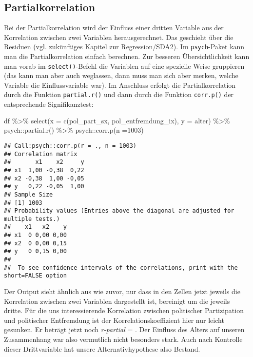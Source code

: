 \documentclass[
]{book}
\newenvironment{Shaded}{\begin{snugshade}}{\end{snugshade}}
\newcommand{\AttributeTok}[1]{\textcolor[rgb]{0.77,0.63,0.00}{#1}}
\newcommand{\DecValTok}[1]{\textcolor[rgb]{0.00,0.00,0.81}{#1}}
\newcommand{\FunctionTok}[1]{\textcolor[rgb]{0.00,0.00,0.00}{#1}}
\newcommand{\NormalTok}[1]{#1}
\newcommand{\SpecialCharTok}[1]{\textcolor[rgb]{0.00,0.00,0.00}{#1}}
\begin{document}
\hypertarget{partialkorrelation}{%
\subsection{Partialkorrelation}\label{partialkorrelation}}

Bei der Partialkorrelation wird der Einfluss einer dritten Variable aus der Korrelation zwischen zwei Variablen herausgerechnet. Das geschieht über die Residuen (vgl. zukünftiges Kapitel zur Regression/SDA2). Im \texttt{psych}-Paket kann man die Partialkorrelation einfach berechnen. Zur besseren Übersichtlichkeit kann man vorab im \texttt{select()}-Befehl die Variablen auf eine spezielle Weise gruppieren (das kann man aber auch weglassen, dann muss man sich aber merken, welche Variable die Einflussvariable war). Im Anschluss erfolgt die Partialkorrelation durch die Funktion \texttt{partial.r()} und dann durch die Funktion \texttt{corr.p()} der entsprechende Signifikanztest:

\begin{Shaded}
\begin{Highlighting}[]
\NormalTok{df }\SpecialCharTok{\%\textgreater{}\%} 
  \FunctionTok{select}\NormalTok{(}\AttributeTok{x =} \FunctionTok{c}\NormalTok{(pol\_part\_sx, pol\_entfremdung\_ix), }\AttributeTok{y =}\NormalTok{ alter) }\SpecialCharTok{\%\textgreater{}\%} 
\NormalTok{  psych}\SpecialCharTok{::}\FunctionTok{partial.r}\NormalTok{() }\SpecialCharTok{\%\textgreater{}\%} 
\NormalTok{  psych}\SpecialCharTok{::}\FunctionTok{corr.p}\NormalTok{(}\AttributeTok{n =}\DecValTok{1003}\NormalTok{)}
\end{Highlighting}
\end{Shaded}

\begin{verbatim}
## Call:psych::corr.p(r = ., n = 1003)
## Correlation matrix 
##       x1    x2     y
## x1  1,00 -0,38  0,22
## x2 -0,38  1,00 -0,05
## y   0,22 -0,05  1,00
## Sample Size 
## [1] 1003
## Probability values (Entries above the diagonal are adjusted for multiple tests.) 
##    x1   x2    y
## x1  0 0,00 0,00
## x2  0 0,00 0,15
## y   0 0,15 0,00
## 
##  To see confidence intervals of the correlations, print with the short=FALSE option
\end{verbatim}

Der Output sieht ähnlich aus wie zuvor, nur dass in den Zellen jetzt jeweils die Korrelation zwischen zwei Variablen dargestellt ist, bereinigt um die jeweils dritte. Für die uns interessierende Korrelation zwischen politischer Partizipation und politischer Entfremdung ist der Korrelationskoeffizient hier nur leicht gesunken. Er beträgt jetzt noch \emph{r-partial} = . Der Einfluss des Alters auf unseren Zusammenhang war also vermutlich nicht besonders stark. Auch nach Kontrolle dieser Drittvariable hat unsere Alternativhypothese also Bestand.
\end{document}
